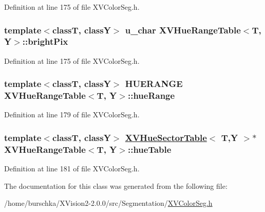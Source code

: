 Definition at line 175 of file XVColor\-Seg.h.\label{XVHueRangeTable_n1}
\hypertarget{class_XVHueRangeTable_n1}{
\subsubsection[brightPix]{\setlength{\rightskip}{0pt plus 5cm}template$<$classT, classY$>$ u\_\-char XVHue\-Range\-Table$<$T, Y$>$::bright\-Pix}}




Definition at line 175 of file XVColor\-Seg.h.\label{XVHueRangeTable_m0}
\hypertarget{class_XVHueRangeTable_m0}{
\subsubsection[hueRange]{\setlength{\rightskip}{0pt plus 5cm}template$<$classT, classY$>$ HUERANGE XVHue\-Range\-Table$<$T, Y$>$::hue\-Range}}




Definition at line 179 of file XVColor\-Seg.h.\label{XVHueRangeTable_m1}
\hypertarget{class_XVHueRangeTable_m1}{
\subsubsection[hueTable]{\setlength{\rightskip}{0pt plus 5cm}template$<$classT, classY$>$ \hyperlink{class_XVHueSectorTable}{XVHue\-Sector\-Table}$<$ T,Y $>$$\ast$ XVHue\-Range\-Table$<$T, Y$>$::hue\-Table}}




Definition at line 181 of file XVColor\-Seg.h.

The documentation for this class was generated from the following file:\begin{CompactItemize}
\item 
/home/burschka/XVision2-2.0.0/src/Segmentation/\hyperlink{XVColorSeg.h-source}{XVColor\-Seg.h}\end{CompactItemize}
